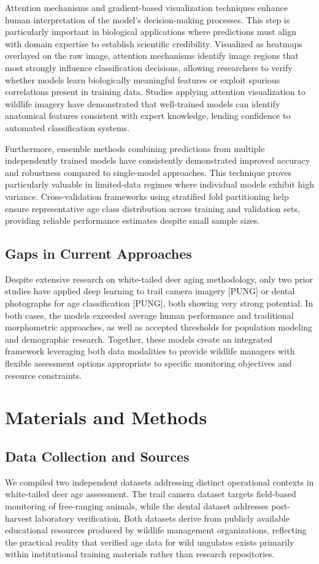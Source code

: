 \documentclass{iopjournal}
\begin{document}
Attention mechanisms and gradient-based visualization techniques enhance human interpretation of the model's decision-making processes. This step is particularly important in biological applications where predictions must align with domain expertise to establish scientific credibility. Visualized as heatmaps overlayed on the raw image, attention mechanisms identify image regions that most strongly influence classification decisions, allowing researchers to verify whether models learn biologically meaningful features or exploit spurious correlations present in training data. Studies applying attention visualization to wildlife imagery have demonstrated that well-trained models can identify anatomical features consistent with expert knowledge, lending confidence to automated classification systems.

Furthermore, ensemble methods combining predictions from multiple independently trained models have consistently demonstrated improved accuracy and robustness compared to single-model approaches. This technique proves particularly valuable in limited-data regimes where individual models exhibit high variance. Cross-validation frameworks using stratified fold partitioning help ensure representative age class distribution across training and validation sets, providing reliable performance estimates despite small sample sizes.

\subsection{Gaps in Current Approaches}
Despite extensive research on white-tailed deer aging methodology, only two prior studies have applied deep learning to trail camera imagery [PUNG] or dental photographs for age classification [PUNG], both showing very strong potential. In both cases, the models exceeded average human performance and traditional morphometric approaches,  as well as accepted thresholds for population modeling and demographic research. Together, these models create an integrated framework leveraging both data modalities to provide wildlife managers with flexible assessment options appropriate to specific monitoring objectives and resource constraints.


\section{Materials and Methods}
\subsection{Data Collection and Sources}
We compiled two independent datasets addressing distinct operational contexts in white-tailed deer age assessment. The trail camera dataset targets field-based monitoring of free-ranging animals, while the dental dataset addresses post-harvest laboratory verification. Both datasets derive from publicly available educational resources produced by wildlife management organizations, reflecting the practical reality that verified age data for wild ungulates exists primarily within institutional training materials rather than research repositories.
\end{document}
